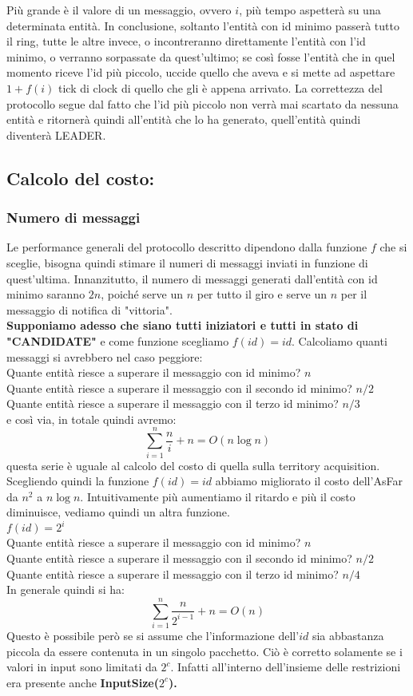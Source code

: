 Più grande è il valore di un messaggio, ovvero $i$, più tempo aspetterà su una
determinata entità. In conclusione, soltanto l'entità con id minimo passerà
tutto il ring, tutte le altre invece, o incontreranno direttamente l'entità con
l'id minimo, o verranno sorpassate da quest'ultimo; se così fosse l'entità che
in quel momento riceve l'id più piccolo, uccide quello che aveva e si mette ad
aspettare $1+f(i)$ tick di clock di quello che gli è appena arrivato. La
correttezza del protocollo segue dal fatto che l'id più piccolo non verrà mai
scartato da nessuna entità e ritornerà quindi all'entità che lo ha generato,
quell'entità quindi diventerà LEADER.

\subsection{Calcolo del costo:}
\subsubsection{Numero di messaggi}
Le performance generali del protocollo descritto dipendono dalla funzione $f$
che si sceglie, bisogna quindi stimare il numeri di messaggi inviati in funzione
di quest'ultima. Innanzitutto, il numero di messaggi generati dall'entità con id
minimo saranno $2n$, poiché serve un $n$ per tutto il giro e serve un $n$ per il
messaggio di notifica di "vittoria".\\
\textbf{Supponiamo adesso che siano tutti iniziatori e tutti in stato di
    "CANDIDATE"} e come funzione scegliamo \textbf{$f(id) = id$}. Calcoliamo quanti
messaggi si avrebbero nel caso peggiore:\\
Quante entità riesce a superare il messaggio con id minimo? $n$\\
Quante entità riesce a superare il messaggio con il secondo id minimo? $n/2$\\
Quante entità riesce a superare il messaggio con il terzo id minimo? $n/3$\\
e così via, in totale quindi avremo: $$\sum_{i=1}^{n}\frac{n}{i} + n = O(n \log
    n)$$ questa serie è uguale al calcolo del costo di quella sulla territory
acquisition. Scegliendo quindi la funzione $f(id) = id$ abbiamo migliorato il
costo dell'AsFar da $n^2$ a $n \log n$. Intuitivamente più aumentiamo il ritardo
e più il costo diminuisce, vediamo quindi un altra funzione.\\
$f(id) = 2^i$\\
Quante entità riesce a superare il messaggio con id minimo? $n$\\
Quante entità riesce a superare il messaggio con il secondo id minimo? $n/2$\\
Quante entità riesce a superare il messaggio con il terzo id minimo? $n/4$\\
In generale quindi si ha:
$$\sum_{i=1}^{n}\frac{n}{2^{i-1}}  +n = O(n)$$ Questo è possibile però se si
assume che l'informazione dell'$id$ sia abbastanza piccola da essere contenuta
in un singolo pacchetto. Ciò è corretto solamente se i valori in input sono
limitati da $2^c$. Infatti all'interno dell'insieme delle restrizioni era
presente anche \textbf{InputSize($2^c$).}\\

